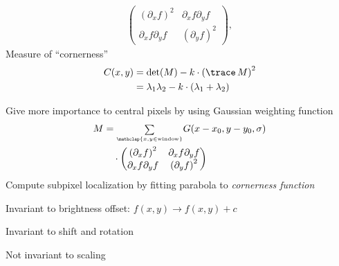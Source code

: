 \begin{compactdesc}
\begin{gather*}
			\begin{pmatrix}
				\left( \partial_x f \right)^2&\partial_xf\partial_yf\\
				\partial_xf\partial_yf&\left( \partial_y f \right)^2
			\end{pmatrix},
		\end{gather*}
		Measure of ``cornerness''
		\begin{align*}
			C(x,y)&=\det(M)-k\cdot \left( \trace\, M \right)^2\\
			&=\lambda_1\lambda_2-k\cdot(\lambda_1+\lambda_2)
		\end{align*}
	\item[\lp{Corner importance weight}] Give more importance to central pixels by using Gaussian weighting function
		\begin{align*}
			M&={\scriptstyle\sum\limits_{\mathclap{x,y\in\text{window}}}}^{}G(x-x_0,y-y_0,\sigma)\\
			&\quad\cdot
			\begin{pmatrix}
				\left( \partial_xf \right)^2&\partial_xf\partial_yf\\
				\partial_xf\partial_yf&\left( \partial_yf \right)^2
			\end{pmatrix}
		\end{align*}
		Compute subpixel localization by fitting parabola to \emph{cornerness function}
	\item[\lp{Robustness of Harris corner detector}]
		\begin{inparaenum}[\itshape(1)]
			\item Invariant to brightness offset: $f(x,y)\to f(x,y)+c$
			\item Invariant to shift and rotation
			\item Not invariant to scaling
		\end{inparaenum}

\end{compactdesc}

